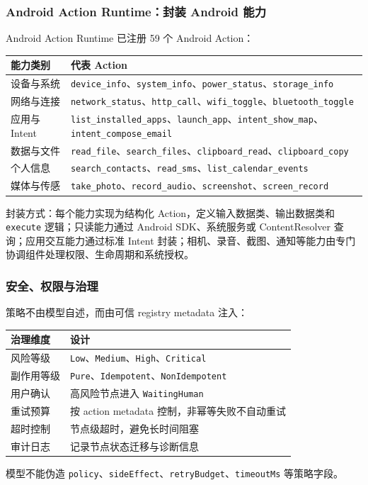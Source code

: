 \documentclass[aspectratio=169]{ctexbeamer}
\newcommand{\code}[1]{\texttt{#1}}
\begin{document}
\begin{frame}
  \frametitle{Android Action Runtime：封装 Android 能力}
  Android Action Runtime 已注册 59 个 Android Action：

  \vspace{0.4em}
  \scriptsize
  \begin{tabularx}{\textwidth}{p{}Y}
    \toprule
    能力类别 & 代表 Action \\
    \midrule
    设备与系统 & \code{device\_info}、\code{system\_info}、\code{power\_status}、\code{storage\_info} \\
    网络与连接 & \code{network\_status}、\code{http\_call}、\code{wifi\_toggle}、\code{bluetooth\_toggle} \\
    应用与 Intent & \code{list\_installed\_apps}、\code{launch\_app}、\code{intent\_show\_map}、\code{intent\_compose\_email} \\
    数据与文件 & \code{read\_file}、\code{search\_files}、\code{clipboard\_read}、\code{clipboard\_copy} \\
    个人信息 & \code{search\_contacts}、\code{read\_sms}、\code{list\_calendar\_events} \\
    媒体与传感 & \code{take\_photo}、\code{record\_audio}、\code{screenshot}、\code{screen\_record} \\
    \bottomrule
  \end{tabularx}

  \vspace{0.4em}
  \normalsize
  封装方式：每个能力实现为结构化 Action，定义输入数据类、输出数据类和 \code{execute} 逻辑；只读能力通过 Android SDK、系统服务或 ContentResolver 查询；应用交互能力通过标准 Intent 封装；相机、录音、截图、通知等能力由专门协调组件处理权限、生命周期和系统授权。
\end{frame}

\begin{frame}
  \frametitle{安全、权限与治理}
  策略不由模型自述，而由可信 registry metadata 注入：

  \vspace{0.4em}
  \scriptsize
  \begin{tabularx}{\textwidth}{p{}Y}
    \toprule
    治理维度 & 设计 \\
    \midrule
    风险等级 & \code{Low}、\code{Medium}、\code{High}、\code{Critical} \\
    副作用等级 & \code{Pure}、\code{Idempotent}、\code{NonIdempotent} \\
    用户确认 & 高风险节点进入 \code{WaitingHuman} \\
    重试预算 & 按 action metadata 控制，非幂等失败不自动重试 \\
    超时控制 & 节点级超时，避免长时间阻塞 \\
    审计日志 & 记录节点状态迁移与诊断信息 \\
    \bottomrule
  \end{tabularx}

  \vspace{0.6em}
  \normalsize
  模型不能伪造 \code{policy}、\code{sideEffect}、\code{retryBudget}、\code{timeoutMs} 等策略字段。
\end{frame}
\end{document}
